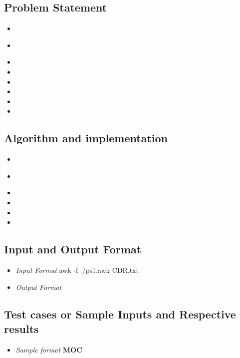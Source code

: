 \documentclass[10pt]{article}
\begin{document}
\subsection{Problem Statement}
\textbf{ }
\begin{itemize}
		\item  
		\subitem 
		\item ​
		\item 
		\item 
		\item 
		\item 
		\item 
		\item 
\end{itemize}

\subsection{Algorithm and implementation}

\begin{itemize}
		\item 
		\item \cite{1} 	
		\item  
		\item 
		\item 
		\item 
\end{itemize}

\newpage


\subsection{Input and Output Format}
\begin{itemize}
		\item \textit{Input Format}
		\subitem awk -f ./ps1.awk CDR.txt 		
		\item \textit{Output Format}
		\subitem \cite{2}
		\subitem  
		\subitem 
		\subitem 
		\subitem 
\end{itemize}

\subsection{Test cases or Sample Inputs and Respective results}
\begin{itemize}
		\item \textit{Sample format}
		\subitem \textbf{MOC}
		\subitem 
\end{itemize}
\end{document}
